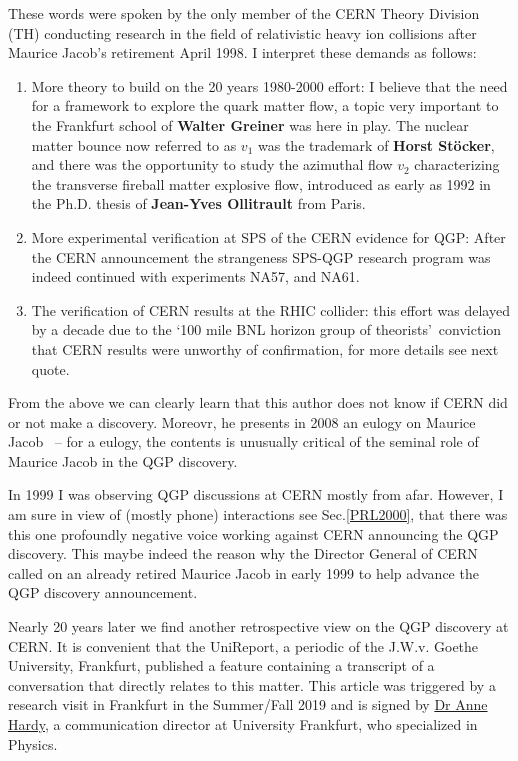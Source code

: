 These words were spoken by the only member of the CERN Theory Division (TH) conducting research in the field of relativistic heavy ion collisions  after Maurice Jacob\rq s retirement April 1998. I interpret these demands as follows:
\begin{enumerate}
\item 
More theory to build on the 20 years 1980-2000 effort: I believe that  the need for a framework to explore the quark matter flow, a topic very important to the Frankfurt school of \textbf{Walter Greiner} was here in play. The nuclear matter bounce now referred to as $v_1$ was the trademark of \textbf{Horst St\"ocker}, and there was the opportunity to study the azimuthal flow $v_2$  characterizing the transverse fireball matter explosive flow, introduced as early as 1992 in the Ph.D. thesis of \textbf{Jean-Yves Ollitrault}\cite{Ollitrault:1992bk} from Paris.
\item
More experimental verification at SPS of the CERN evidence for QGP: After the CERN announcement the strangeness SPS-QGP research program was indeed continued with experiments NA57, and NA61.
\item  The verification of CERN results at the RHIC collider: this effort was delayed by a decade due to the \lq 100 mile BNL horizon group of theorists\rq\ conviction that CERN results were unworthy of confirmation, for more details see next quote. 
\end{enumerate}

From the above we can clearly learn that this author  does not know if CERN did or not make a discovery. Moreovr, he presents in 2008 an eulogy on Maurice Jacob~\cite{Heinz:2000ba} -- for a eulogy, the contents is unusually critical of the seminal role of Maurice Jacob in the QGP discovery.  

In 1999 I was observing QGP discussions at CERN mostly from afar. However, I am sure in view of (mostly phone) interactions  see Sec.\ref{PRL2000}, that there was this  one profoundly negative voice working against CERN announcing the QGP discovery. This maybe indeed the reason why the Director General of CERN called on an already retired Maurice Jacob in early 1999 to help advance the QGP discovery announcement. 

Nearly 20 years later we find another retrospective view on the QGP discovery at CERN. It is convenient that the UniReport, a periodic of the J.W.v. Goethe University, Frankfurt, published a feature containing a transcript of a conversation  that directly relates to this matter. This article was triggered by a research visit in Frankfurt in the Summer/Fall 2019 and is signed by \href{http://www.muk.uni-frankfurt.de/36152080/anne_hardy}{Dr Anne Hardy}, a communication director at University Frankfurt, who specialized in Physics.\\ 

